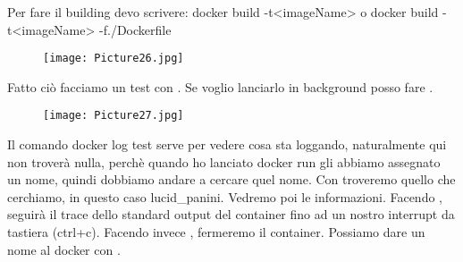 \documentclass[a4paper,12pt]{article}
\begin{document}
Per fare il building devo scrivere:
\newline
docker build -t<imageName> o docker build -t<imageName> -f./Dockerfile 
\begin{figure}[H]
    \centering
    \texttt{[image: Picture26.jpg]}
    \label{etichetta48}
\end{figure}
\newpage
\noindent Fatto ciò facciamo un test con .
\newline
Se voglio lanciarlo in background posso fare .
\begin{figure}[H]
    \centering
    \texttt{[image: Picture27.jpg]}
    \label{etichetta49}
\end{figure}
\noindent Il comando docker log test serve per vedere cosa sta loggando, naturalmente qui non troverà nulla, perchè quando ho lanciato docker run gli abbiamo assegnato un nome, quindi dobbiamo andare a cercare quel nome. Con  troveremo quello che cerchiamo, in questo caso lucid\_panini. Vedremo poi le informazioni.
Facendo , seguirà il trace dello standard output del container fino ad un nostro interrupt da tastiera (ctrl+c). Facendo invece , fermeremo il container. Possiamo dare un nome al docker con .
\end{document}
